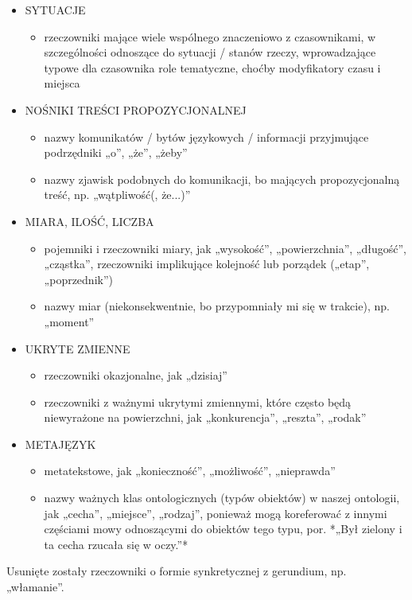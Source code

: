\documentclass[12pt]{mwart}
\theoremstyle{remark}
\begin{document}
\begin{itemize}
\item SYTUACJE
\begin{itemize}
\item rzeczowniki mające wiele wspólnego znaczeniowo z czasownikami, w szczególności odnoszące do sytuacji / stanów rzeczy, wprowadzające typowe dla czasownika role tematyczne, choćby modyfikatory czasu i miejsca
\end{itemize}
\item NOŚNIKI TREŚCI PROPOZYCJONALNEJ
\begin{itemize}
\item nazwy komunikatów / bytów językowych / informacji przyjmujące podrzędniki „o”, „że”, „żeby”
\item nazwy zjawisk podobnych do komunikacji, bo mających propozycjonalną treść, np. „wątpliwość(, że...)”
\end{itemize}
\item MIARA, ILOŚĆ, LICZBA
\begin{itemize}
\item pojemniki i rzeczowniki miary, jak „wysokość”, „powierzchnia”, „długość”, „cząstka”, rzeczowniki implikujące kolejność lub porządek („etap”, „poprzednik”)
\item nazwy miar (niekonsekwentnie, bo przypomniały mi się w trakcie), np. „moment”
\end{itemize}
\item UKRYTE ZMIENNE
\begin{itemize}
\item rzeczowniki okazjonalne, jak „dzisiaj”
\item rzeczowniki z ważnymi ukrytymi zmiennymi, które często będą niewyrażone na powierzchni, jak „konkurencja”, „reszta”, „rodak”
\end{itemize}
\item METAJĘZYK
\begin{itemize}
\item metatekstowe, jak „konieczność”, „możliwość”, „nieprawda”
\item nazwy ważnych klas ontologicznych (typów obiektów) w naszej ontologii, jak „cecha”, „miejsce”, „rodzaj”, ponieważ mogą koreferować z innymi częściami mowy odnoszącymi do obiektów tego typu, por. *„Był zielony i ta cecha rzucała się w oczy.”*
\end{itemize}
\end{itemize}
Usunięte zostały rzeczowniki o formie synkretycznej z gerundium, np. „włamanie”.
\end{document}
